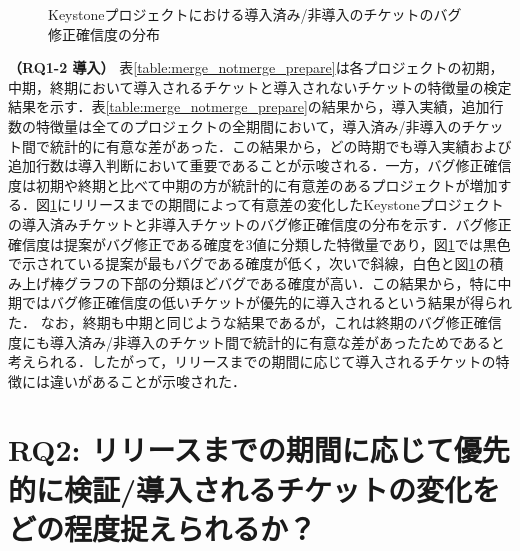 \documentclass[T,J]{fose} %
\newcommand{\rqtwo}{リリースまでの期間に応じて優先的に検証/導入されるチケットの変化をどの程度捉えられるか？}
\begin{document}
\begin{figure}[t]
\begin{center}
\caption{Keystoneプロジェクトにおける導入済み/非導入のチケットのバグ修正確信度の分布}
\label{fig:merge_notmerge}
\end{center}
\end{figure}

\textbf{（RQ1-2 導入）} 表\ref{table:merge_notmerge_prepare}は各プロジェクトの初期，中期，終期において導入されるチケットと導入されないチケットの特徴量の検定結果を示す．表\ref{table:merge_notmerge_prepare}の結果から，導入実績，追加行数の特徴量は全てのプロジェクトの全期間において，導入済み/非導入のチケット間で統計的に有意な差があった．この結果から，どの時期でも導入実績および追加行数は導入判断において重要であることが示唆される．一方，バグ修正確信度は初期や終期と比べて中期の方が統計的に有意差のあるプロジェクトが増加する．図\ref{fig:merge_notmerge}にリリースまでの期間によって有意差の変化したKeystoneプロジェクトの導入済みチケットと非導入チケットのバグ修正確信度の分布を示す．バグ修正確信度は提案がバグ修正である確度を3値に分類した特徴量であり，図\ref{fig:merge_notmerge}では黒色で示されている提案が最もバグである確度が低く，次いで斜線，白色と図\ref{fig:merge_notmerge}の積み上げ棒グラフの下部の分類ほどバグである確度が高い．この結果から，特に中期ではバグ修正確信度の低いチケットが優先的に導入されるという結果が得られた．
なお，終期も中期と同じような結果であるが，これは終期のバグ修正確信度にも導入済み/非導入のチケット間で統計的に有意な差があったためであると考えられる．したがって，リリースまでの期間に応じて導入されるチケットの特徴には違いがあることが示唆された．


\section{RQ2: \rqtwo}\label{sec:rq2}
\end{document}
